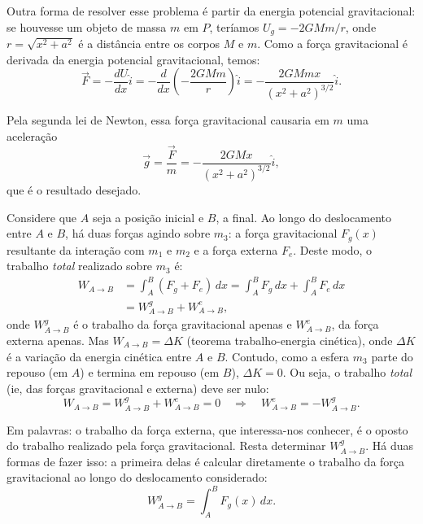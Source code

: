 \documentclass[a4paper]{article}
\newcommand\myrightarrow{\quad\Rightarrow\quad}
\begin{document}
\begin{resolucoes}
\begin{exercicio}
  Outra forma de resolver esse problema é partir da energia potencial gravitacional: se houvesse um objeto de massa $m$ em $P$, teríamos $U_g = -2GMm/r$, onde $r = \sqrt{x^2 + a^2}$ é a distância entre os corpos $M$ e $m$.
  Como a força gravitacional é derivada da energia potencial gravitacional, temos:
  \begin{equation*}
  \vec F = -\frac{dU}{dx}\hat i = -\frac{d}{dx}\left(-\frac{2GMm}{r}\right)\hat i = -\frac{2GMmx}{\left(x^2 + a^2\right)^{3/2}}\hat i.
  \end{equation*}
  
  Pela segunda lei de Newton, essa força gravitacional causaria em $m$ uma aceleração
  \begin{equation*}
  \vec g = \frac{\vec F}{m} = -\frac{2GMx}{\left(x^2 + a^2\right)^{3/2}}\hat i,
  \end{equation*}
  que é o resultado desejado.  
  \end{exercicio}
  
  \begin{exercicio}
  
  \begin{compactenum}[(a)]
  \item Considere que $A$ seja a posição inicial e $B$, a final.
  Ao longo do deslocamento entre $A$ e $B$, há duas forças agindo sobre $m_3$: a força gravitacional $F_g(x)$ resultante da interação com $m_1$ e $m_2$ e a força externa $F_e$.
  Deste modo, o trabalho \emph{total} realizado sobre $m_3$ é:
  \begin{align*}
  W_{A\to B} &= \int_{A}^{B}\left(F_g + F_e\right)\, dx = \int_{A}^{B}F_g\, dx + \int_{A}^{B}F_e\, dx \\
             &= W_{A\to B}^{g} + W_{A\to B}^{e},
  \end{align*}
  onde $W_{A\to B}^{g}$ é o trabalho da força gravitacional apenas e $W_{A\to B}^{e}$, da força externa apenas.
  Mas $W_{A\to B} = \Delta K$ (teorema trabalho-energia cinética), onde $\Delta K$ é a variação da energia cinética entre $A$ e $B$.
  Contudo, como a esfera $m_3$ parte do repouso (em $A$) e termina em repouso (em $B$), $\Delta K = 0$.
  Ou seja, o trabalho \emph{total} (ie, das forças gravitacional e externa) deve ser nulo:
  \begin{equation}\label{eq:W}
  W_{A\to B} = W_{A\to B}^{g} + W_{A\to B}^{e} = 0 \myrightarrow W_{A\to B}^{e} = -W_{A\to B}^{g}.
  \end{equation}
  
  Em palavras: o trabalho da força externa, que interessa-nos conhecer, é o oposto do trabalho realizado pela força gravitacional.  
  Resta determinar $W_{A\to B}^{g}$.
  Há duas formas de fazer isso: a primeira delas é calcular diretamente o trabalho da força gravitacional ao longo do deslocamento considerado:
  \begin{equation*}
  W_{A\to B}^{g} = \int_{A}^{B} F_g(x)\,dx.
  \end{equation*}
  

\end{compactenum}
\end{exercicio}
\end{resolucoes}
\end{document}
